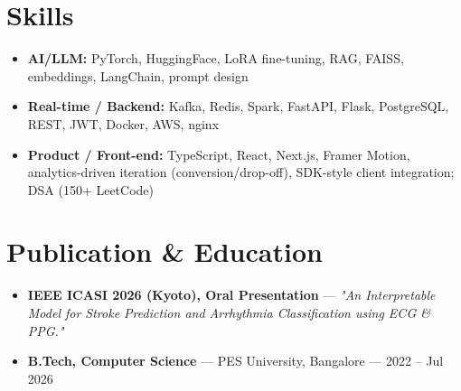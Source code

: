 \documentclass[10pt,a4paper]{article}
\begin{document}
\section*{Skills}
\begin{itemize}
\item \textbf{AI/LLM:} PyTorch, HuggingFace, LoRA fine-tuning, RAG, FAISS, embeddings, LangChain, prompt design
\item \textbf{Real-time / Backend:} Kafka, Redis, Spark, FastAPI, Flask, PostgreSQL, REST, JWT, Docker, AWS, nginx
\item \textbf{Product / Front-end:} TypeScript, React, Next.js, Framer Motion, analytics-driven iteration (conversion/drop-off), SDK-style client integration; DSA (150+ LeetCode)
\end{itemize}
\section*{Publication \& Education}
\begin{itemize}
\item \textbf{IEEE ICASI 2026 (Kyoto), Oral Presentation} --- \textit{"An Interpretable Model for Stroke Prediction and Arrhythmia Classification using ECG \& PPG."}
\item \textbf{B.Tech, Computer Science} --- PES University, Bangalore --- 2022 -- Jul 2026
\end{itemize}
\end{document}
